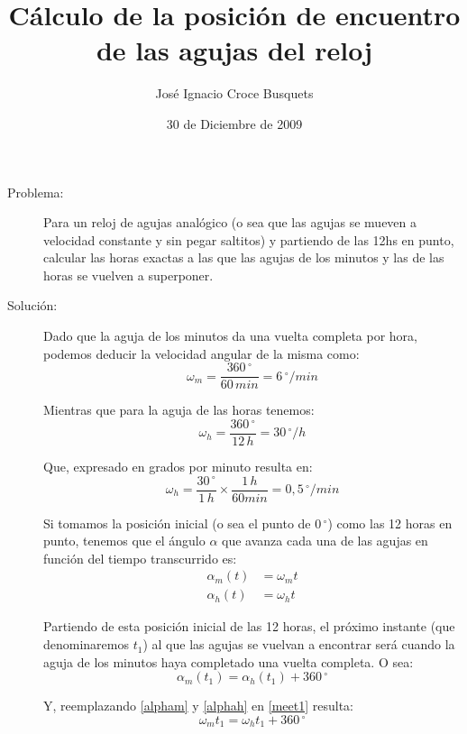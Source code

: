 \documentclass[a4paper,11pt]{article}
\author{Jos\'e Ignacio Croce Busquets}
\date{30 de Diciembre de 2009}
\title{C\'alculo de la posici\'on de encuentro de las agujas del reloj}
\begin{document}
\maketitle
\begin{description}
\item[Problema:]
Para un reloj de agujas anal\'ogico (o sea que las agujas se mueven a
velocidad constante y sin pegar saltitos) y partiendo de las 12hs en punto,
calcular las horas exactas a las que las agujas de los minutos y las de las
horas se vuelven a superponer.

\item[Soluci\'on:]
Dado que la aguja de los minutos da una vuelta completa por hora, podemos
deducir la velocidad angular de la misma como:
\begin{equation}
\omega_m = \frac{360\,^\circ}{60\,min} = 6\,^\circ/min \label{omegam}
\end{equation}

Mientras que para la aguja de las horas tenemos:
\begin{equation*}
\omega_h = \frac{360\,^\circ}{12\,h} = 30\,^\circ/h
\end{equation*}

Que, expresado en grados por minuto resulta en:
\begin{equation}
\omega_h = \frac{30\,^\circ}{1\,h} \times \frac{1\,h}{60min} = 0,5\,^\circ/min
\label{omegah}
\end{equation}

Si tomamos la posici\'on inicial (o sea el punto de $0\,^\circ$) como las 12
horas en punto, tenemos que el \'angulo $\alpha$ que avanza cada una de las
agujas en funci\'on del tiempo transcurrido es:
\begin{align}
\alpha_m(t) &= \omega_mt \label{alpham} \\
\alpha_h(t) &= \omega_ht \label{alphah}
\end{align}

Partiendo de esta posici\'on inicial de las 12 horas, el pr\'oximo instante
(que denominaremos $t_1$) al que las agujas se vuelvan a encontrar ser\'a
cuando la aguja de los minutos haya completado una vuelta completa. O sea:
\begin{equation}
\alpha_m(t_1) = \alpha_h(t_1) + 360\,^\circ
\label{meet1}
\end{equation}

Y, reemplazando \eqref{alpham} y \eqref{alphah} en \eqref{meet1} resulta:
\begin{equation*}
\omega_m t_1 = \omega_h t_1 + 360\,^\circ
\end{equation*}


\end{description}
\end{document}
